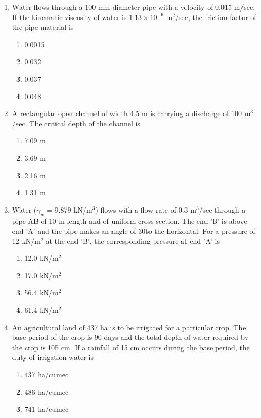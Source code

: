 \documentclass[journal]{IEEEtran}
\begin{document}
\begin{enumerate}
\item Water flows through a 100 mm diameter pipe with a velocity of 0.015 m/sec. If the kinematic viscosity of water is $1.13 \times 10^{-6}$ $\text{m}^2$/sec, the friction factor of the pipe material is
    \begin{enumerate}
        \item 0.0015
        \item 0.032
        \item 0.037
        \item 0.048 \\
    \end{enumerate}
\item A rectangular open channel of width 4.5 m is carrying a discharge of 100 $\text{m}^3$/sec. The critical depth of the channel is
\begin{enumerate}
    \item 7.09 m
    \item 3.69 m
    \item 2.16 m
    \item 1.31 m \\
\end{enumerate}
\item Water ($\gamma_w$ = 9.879 kN/$\text{m}^3$) flows with a flow rate of 0.3 $\text{m}^3$/sec through a pipe AB of 10 m length and of uniform cross section. The end 'B' is above end 'A' and the pipe makes an angle of 30\degree to the horizontal. For a pressure of 12 kN/$\text{m}^2$ at the end 'B', the corresponding pressure at end 'A' is
\begin{enumerate}
    \item 12.0 kN/$\text{m}^2$
    \item 17.0 kN/$\text{m}^2$
    \item 56.4 kN/$\text{m}^2$
    \item 61.4 kN/$\text{m}^2$ \\
\end{enumerate}
\item An agricultural land of 437 ha is to be irrigated for a particular crop. The base period of the crop is 90 days and the total depth of water required by the crop is 105 cm. If a rainfall of 15 cm occurs during the base period, the duty of irrigation water is
 \begin{enumerate}
     \item 437 ha/cumec
     \item 486 ha/cumec
     \item 741 ha/cumec

\end{enumerate}
\end{enumerate}
\end{document}
